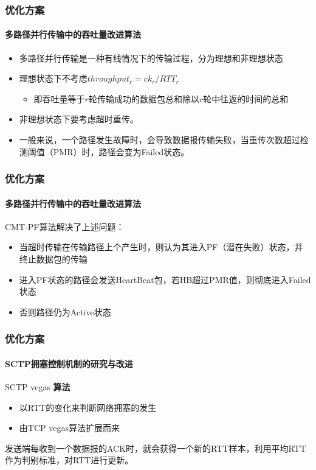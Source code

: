 \documentclass[xcolor={usenames,dvipsnames}]{beamer}
\begin{document}
\begin{frame}
	\frametitle{\textbf{优化方案}}
	\framesubtitle{\textbf{多路径并行传输中的吞吐量改进算法}}
	\begin{itemize}
		\item 多路径并行传输是一种有线情况下的传输过程，分为理想和非理想状态
		\item 理想状态下不考虑$throughput_r=ck_r/RTT_r$
		\begin{itemize}
			\item 即吞吐量等于$r$轮传输成功的数据包总和除以$r$轮中往返的时间的总和
		\end{itemize}
		\item 非理想状态下要考虑超时重传。
		\item 一般来说，一个路径发生故障时，会导致数据报传输失败，当重传次数超过检测阈值（PMR）时，路径会变为Failed状态。
	\end{itemize}
\end{frame}

\begin{frame}
	\frametitle{\textbf{优化方案}}
	\framesubtitle{\textbf{多路径并行传输中的吞吐量改进算法}}
	CMT-PF算法解决了上述问题：
	\begin{itemize}
		\item 当超时传输在传输路径上个产生时，则认为其进入PF（潜在失败）状态，并终止数据包的传输
		\item 进入PF状态的路径会发送HeartBeat包，若HB超过PMR值，则彻底进入Failed状态
		\item 否则路径仍为Active状态
	\end{itemize}
\end{frame}

\begin{frame}
	\frametitle{\textbf{优化方案}}
	\framesubtitle{SCTP\textbf{拥塞控制机制的研究与改进}}
	\begin{exampleblock}{SCTP vegas \textbf{算法}}
	  \begin{itemize}
			\item 以RTT的变化来判断网络拥塞的发生
			\item 由TCP vegas算法扩展而来
		\end{itemize}
	\end{exampleblock}
    发送端每收到一个数据报的ACK时，就会获得一个新的RTT样本，利用平均RTT作为判别标准，对RTT进行更新。

\end{frame}
\end{document}
